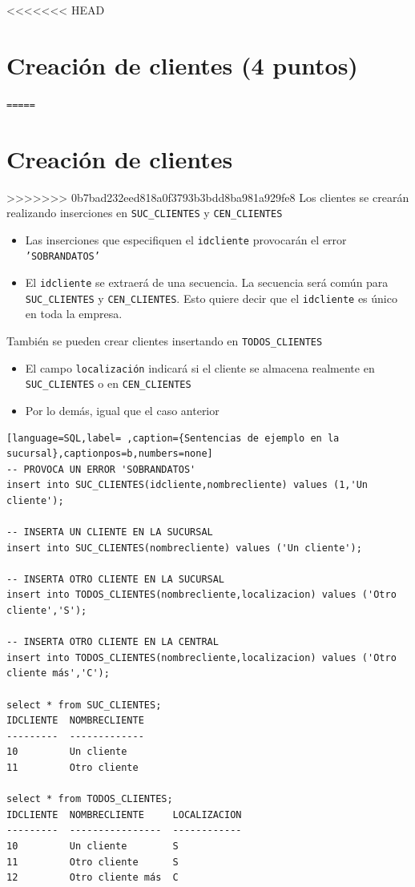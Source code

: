 \documentclass[a4paper]{article}
\begin{document}
\newpage
<<<<<<< HEAD
\section{Creación de clientes (4 puntos)}
\label{sec:org0000012}
\texttt{=====}
\section{Creación de clientes}
\label{sec:org0000015}
>>>>>>> 0b7bad232eed818a0f3793b3bdd8ba981a929fe8
Los clientes se crearán realizando inserciones en \texttt{SUC\_CLIENTES} y \texttt{CEN\_CLIENTES}
\begin{itemize}
\item Las inserciones que especifiquen el \texttt{idcliente} provocarán el error \texttt{'SOBRANDATOS'}
\item El \texttt{idcliente} se extraerá de una secuencia. La secuencia será común para \texttt{SUC\_CLIENTES} y \texttt{CEN\_CLIENTES}. Esto quiere decir que el \texttt{idcliente} es único en toda la empresa.
\end{itemize}
También se pueden crear clientes insertando en \texttt{TODOS\_CLIENTES}
\begin{itemize}
\item El campo \texttt{localización} indicará si el cliente se almacena realmente en \texttt{SUC\_CLIENTES} o en \texttt{CEN\_CLIENTES}
\item Por lo demás, igual que el caso anterior
\end{itemize}



\begin{lstlisting}[language=SQL,label= ,caption={Sentencias de ejemplo en la sucursal},captionpos=b,numbers=none]
-- PROVOCA UN ERROR 'SOBRANDATOS'
insert into SUC_CLIENTES(idcliente,nombrecliente) values (1,'Un cliente');

-- INSERTA UN CLIENTE EN LA SUCURSAL
insert into SUC_CLIENTES(nombrecliente) values ('Un cliente');

-- INSERTA OTRO CLIENTE EN LA SUCURSAL
insert into TODOS_CLIENTES(nombrecliente,localizacion) values ('Otro cliente','S');

-- INSERTA OTRO CLIENTE EN LA CENTRAL
insert into TODOS_CLIENTES(nombrecliente,localizacion) values ('Otro cliente más','C');

select * from SUC_CLIENTES;
IDCLIENTE  NOMBRECLIENTE
---------  -------------
10         Un cliente
11         Otro cliente

select * from TODOS_CLIENTES;
IDCLIENTE  NOMBRECLIENTE     LOCALIZACION
---------  ----------------  ------------
10         Un cliente        S
11         Otro cliente      S
12         Otro cliente más  C
\end{lstlisting}
\end{document}
